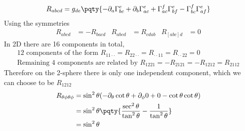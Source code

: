 \documentclass[12pt]{article}
\begin{document}
        \subsection{}\subsubsection{} {\[
            R_{abcd} = g_{de} \pqty{ -\partial_a\Gamma^{e}_{bc} + \partial_b\Gamma^{e}_{ac} +\Gamma^{f}_{ac}\Gamma^{e}_{bf} -\Gamma^{f}_{bc}\Gamma^{e}_{af}}
        \]}
        Using the symmetries \begin{align*}
            R_{abcd} &= - R_{bacd} & R_{abcd} &= R_{cdab}& R_{[abc]d} &= 0
        \end{align*}
        In 2D there are 16 components in total,  \begin{gather*}
            \text{12 components of the form }R_{11\cdot \cdot} =R_{22\cdot \cdot} =R_{\cdot \cdot 11} =R_{\cdot \cdot 22} = 0\\
            \text{Remaining 4 components are related by }R_{1221} = -R_{2121} = -R_{1212} = R_{2112}
        \end{gather*}
        Therefore on the 2-sphere there is only one independent component, which we can choose to be \(R_{1212}\) \begin{align*}
            R_{\theta\phi\theta\phi} &=  \sin^2\theta (- \partial_\theta \cot\theta + \partial_\phi 0 + 0 - \cot\theta \cot\theta)\\ 
            &=  \sin^2\theta\pqty{\frac{\sec^2\theta}{\tan^2\theta} - \frac{1}{\tan^2\theta}}\\ 
            &=  \sin^2\theta
        \end{align*}
\end{document}

